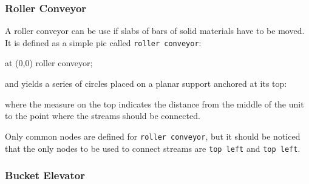 \documentclass[12pt]{article}						%
\newcommand*{\chpn}[1]{\texttt{#1}}				%
\newcommand*{\chpp}[1]{\texttt{#1}}				%
\begin{document}
\subsubsection{Roller Conveyor}

A roller conveyor can be use if slabs of bars of solid materials have to be
moved. It is defined as a simple pic called \chpp{roller conveyor}:
\begin{chpcode}
	\pic at (0,0) {roller conveyor};
\end{chpcode}
and yields a series of circles placed on a planar support anchored at its top:
\begin{center}
\end{center}
where the measure on the top indicates the distance from the middle of the
unit to the point where the streams should be connected.

Only common nodes are defined for \chpp{roller conveyor}, but it should be
noticed that the only nodes to be used to connect streams are \chpn{top left} and
\chpn{top left}.

\subsubsection{Bucket Elevator}
\end{document}
